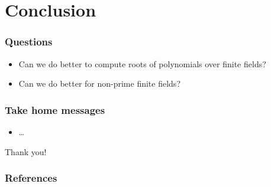 \documentclass[12pt]{beamer}
\begin{document}
\section{Conclusion}

\begin{frame}
 \frametitle{Questions}
 \begin{itemize}
  \item Can we do better to compute roots of polynomials over finite fields?
  \item Can we do better for non-prime finite fields?
 \end{itemize}
\end{frame}

\begin{frame}
 \frametitle{Take home messages}
 \begin{itemize}
  \item \ldots
 \end{itemize}
\end{frame}

\begin{frame}
 \begin{center}
  \huge{Thank you!}
 \end{center}
\end{frame}


\begin{frame}
 \frametitle{References}
 
 

\end{frame}
\end{document}
